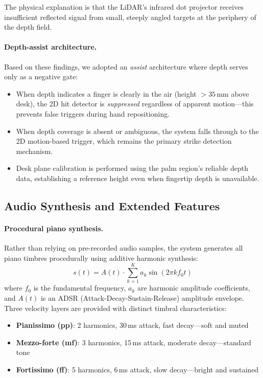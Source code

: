\documentclass[11pt,a4paper]{article}
\begin{document}
The physical explanation is that the LiDAR's infrared dot projector receives insufficient reflected signal from small, steeply angled targets at the periphery of the depth field.

\paragraph{Depth-assist architecture.}
Based on these findings, we adopted an \emph{assist} architecture where depth serves only as a negative gate:
\begin{itemize}[nosep]
    \item When depth indicates a finger is clearly in the air (height $> 35$\,mm above desk), the 2D hit detector is \emph{suppressed} regardless of apparent motion---this prevents false triggers during hand repositioning.
    \item When depth coverage is absent or ambiguous, the system falls through to the 2D motion-based trigger, which remains the primary strike detection mechanism.
    \item Desk plane calibration is performed using the palm region's reliable depth data, establishing a reference height even when fingertip depth is unavailable.
\end{itemize}

\subsection{Audio Synthesis and Extended Features}

\paragraph{Procedural piano synthesis.}
Rather than relying on pre-recorded audio samples, the system generates all piano timbres procedurally using additive harmonic synthesis:
\begin{equation}
    s(t) = A(t) \cdot \sum_{k=1}^{K} a_k \sin(2\pi k f_0 t)
\end{equation}
where $f_0$ is the fundamental frequency, $a_k$ are harmonic amplitude coefficients, and $A(t)$ is an ADSR (Attack-Decay-Sustain-Release) amplitude envelope.
Three velocity layers are provided with distinct timbral characteristics:
\begin{itemize}[nosep]
    \item \textbf{Pianissimo (pp)}: 2 harmonics, 30\,ms attack, fast decay---soft and muted
    \item \textbf{Mezzo-forte (mf)}: 3 harmonics, 15\,ms attack, moderate decay---standard tone
    \item \textbf{Fortissimo (ff)}: 5 harmonics, 6\,ms attack, slow decay---bright and sustained
\end{itemize}
\end{document}
